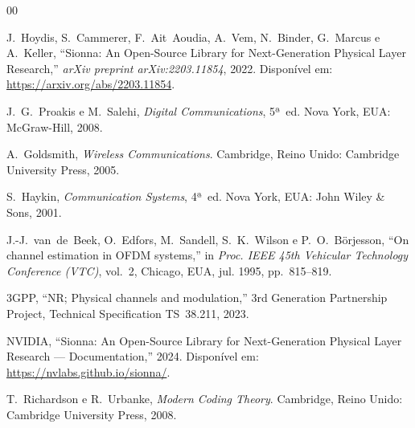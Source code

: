 \documentclass[conference]{IEEEtran}
\begin{document}
\begin{thebibliography}{00}

J.~Hoydis, S.~Cammerer, F.~Ait~Aoudia, A.~Vem, N.~Binder, G.~Marcus e A.~Keller, ``Sionna: An Open-Source Library for Next-Generation Physical Layer Research,'' \textit{arXiv preprint arXiv:2203.11854}, 2022. Disponível em: \url{https://arxiv.org/abs/2203.11854}.

J.~G.~Proakis e M.~Salehi, \textit{Digital Communications}, 5ª~ed. Nova York, EUA: McGraw-Hill, 2008.

A.~Goldsmith, \textit{Wireless Communications}. Cambridge, Reino Unido: Cambridge University Press, 2005.

S.~Haykin, \textit{Communication Systems}, 4ª~ed. Nova York, EUA: John Wiley \& Sons, 2001.

J.-J.~van~de~Beek, O.~Edfors, M.~Sandell, S.~K.~Wilson e P.~O.~Börjesson, ``On channel estimation in OFDM systems,'' in \textit{Proc. IEEE 45th Vehicular Technology Conference (VTC)}, vol.~2, Chicago, EUA, jul. 1995, pp.~815--819.

3GPP, ``NR; Physical channels and modulation,'' 3rd Generation Partnership Project, Technical Specification TS~38.211, 2023.

NVIDIA, ``Sionna: An Open-Source Library for Next-Generation Physical Layer Research --- Documentation,'' 2024. Disponível em: \url{https://nvlabs.github.io/sionna/}.

T.~Richardson e R.~Urbanke, \textit{Modern Coding Theory}. Cambridge, Reino Unido: Cambridge University Press, 2008.

\end{thebibliography}
\end{document}
